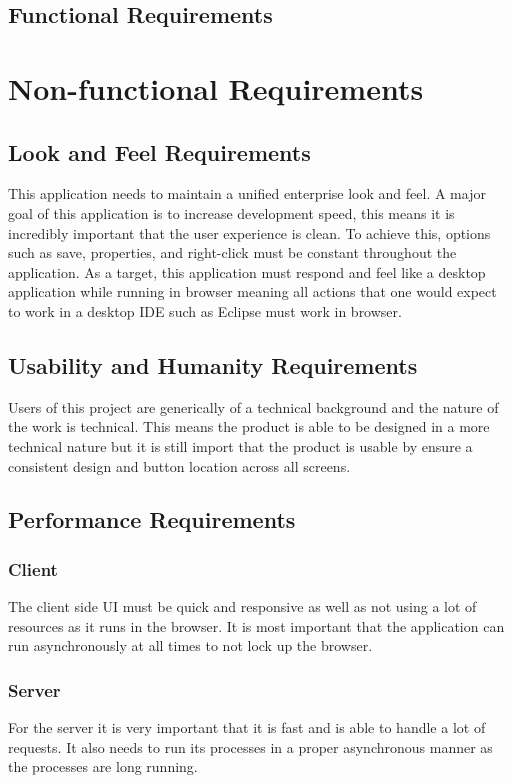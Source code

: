 \documentclass[12pt, titlepage]{article}
\begin{document}
  \subsection{Functional Requirements}

\section{Non-functional Requirements}

  \subsection{Look and Feel Requirements}
  This application needs to maintain a unified enterprise look and feel. A
   major goal of this application is to increase development speed, this 
   means it is incredibly important that the user experience is clean. To 
   achieve this, options such as save, properties, and right-click must be 
   constant throughout the application. As a target, this application must 
   respond and feel like a desktop application while running in browser 
   meaning all actions that one would expect to work in a desktop IDE such
    as Eclipse must work in browser.

  \subsection{Usability and Humanity Requirements}
    Users of this project are generically of a technical background and the 
    nature of the work  is technical. This means the product is able to be 
    designed in a more technical nature but it is still import that the 
    product is usable by ensure a consistent design and button location across 
    all screens.

  \subsection{Performance Requirements}
    \subsubsection{Client}
    The client side UI must be quick and responsive as well as not using a 
    lot of resources as it runs in the browser. It is most important that the 
    application can run asynchronously at all times to not lock up the browser.
    
    \subsubsection{Server}
    For the server it is very important that it is fast and is able to handle 
    a lot of requests. It also needs to run its processes in a proper 
    asynchronous manner as the processes are long running.
\end{document}
